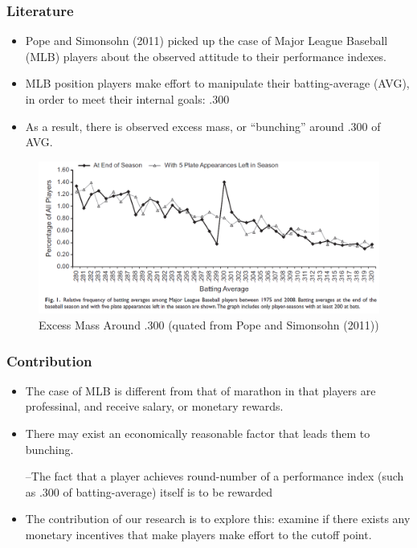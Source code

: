 \documentclass[dvipdfmx,12pt]{beamer}
\begin{document}
\begin{frame}\frametitle{Literature}
  \begin{itemize}
    \item Pope and Simonsohn (2011) picked up the case of Major League Baseball (MLB) players about the observed attitude to their performance indexes.

    \item MLB position players make effort to manipulate their batting-average (AVG), in order to meet their internal goals: .300

    \item As a result, there is observed excess mass, or ``bunching'' around .300 of AVG.
  \end{itemize}
  \begin{figure}
    \small
    \includegraphics[keepaspectratio, scale = 0.33]{graphs/PS_fig1}
    \caption{Excess Mass Around .300 (quated from Pope and Simonsohn (2011))}
    \label{PS_fig}
  \end{figure}
\end{frame}

\begin{frame}\frametitle{Contribution}
  \begin{itemize}
    \item The case of MLB is different from that of marathon in that players are professinal, and receive salary, or monetary rewards.

    \item There may exist an economically reasonable factor that leads them to bunching.

    --The fact that a player achieves round-number of a performance index (such as .300 of batting-average) itself is to be rewarded

    \item The contribution of our research is to explore this: examine if there exists any monetary incentives that make players make effort to the cutoff point.
  \end{itemize}
\end{frame}
\end{document}
